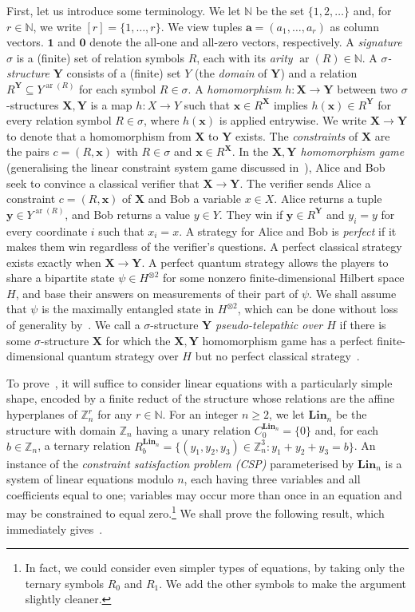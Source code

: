 \documentclass[11pt]{article}
\newcommand{\N}{\mathbb N}
\newcommand{\Z}{\mathbb Z}
\newcommand{\X}{\mathbf X}
\newcommand{\Y}{\mathbf Y}
\newcommand{\Lin}{\mathbf{Lin}}
\DeclareMathOperator{\ar}{ar}
\newcommand{\bone}{\mathbf{1}}
\newcommand{\bzero}{\mathbf{0}}
\newcommand{\ba}{\mathbf{a}}
\newcommand{\bx}{\mathbf{x}}
\newcommand{\by}{\mathbf{y}}
\theoremstyle{plain}
\theoremstyle{definition}
\theoremstyle{remark}
\begin{document}
First, let us introduce some    terminology. We let $\N$ be the set $\{1,2,\dots\}$ and, for $r\in\N$, we write $[r]=\{1,\ldots,r\}$. We view tuples $\ba=(a_1,\dots,a_r)$ as column vectors. $\bone$ and $\bzero$ denote the all-one and all-zero vectors, respectively.
%
A \emph{signature} $\sigma$ is a (finite) set of relation symbols $R$, each with its \emph{arity} $\ar(R)\in\N$.
%
A \textit{$\sigma$-structure} $\Y$ consists of a (finite) set $Y$ (the \emph{domain} of $\Y$) and a relation $R^\Y\subseteq Y^{\ar(R)}$ for each symbol $R\in\sigma$. 
A
\emph{homomorphism} $h:\X\to\Y$ between    two $\sigma$-structures $\X,\Y$ is a map $h:X\to Y$ such that
$\bx\in R^{\X}$ implies $h(\bx)\in R^{\Y}$
%
for every relation symbol $R\in\sigma$, where $h(\bx)$ is applied entrywise. We write $\X\to\Y$ to denote that a homomorphism from $\X$ to $\Y$ exists.
%
The \textit{constraints} of $\X$ are the pairs $c=(R,\bx)$ with $R\in\sigma$ and $\bx\in R^{\X}$.
%
In the \textit{$\X,\Y$ homomorphism game} (generalising the linear constraint system game discussed in~), Alice and Bob seek to convince a classical verifier that $\X\to\Y$.
%
The verifier sends Alice a constraint $c=(R,\bx)$ of $\X$ and Bob a variable $x\in X$. Alice returns a tuple $\by\in Y^{\ar(R)}$, and Bob   returns a value $y\in Y$. They win if $\mathbf y\in R^{\Y}$ and $y_i=y$ for every coordinate $i$ such that $x_i=x$.
%
A strategy for Alice and Bob is \emph{perfect} if it makes them win regardless of the verifier's questions. A perfect classical strategy exists exactly when $\X\to\Y$. A perfect quantum strategy allows the players to share a bipartite state $\psi\in H^{\otimes 2}$ for some nonzero finite-dimensional Hilbert space $H$, and base their answers on measurements of their part of $\psi$. 
We shall assume that $\psi$ is the maximally entangled state in $H^{\otimes 2}$, which can be done without loss of generality by~\cite{abramsky2017quantum}. 
%
We call a $\sigma$-structure $\Y$ \emph{pseudo-telepathic over $H$} if there is some $\sigma$-structure $\X$ for which the $\X,\Y$ homomorphism game has a perfect finite-dimensional quantum strategy over $H$ but no perfect classical strategy~\cite{galliard2002pseudo,brassard2005quantum}.

To prove~, it will suffice to consider linear equations with a particularly simple shape, encoded by a finite reduct of the structure  whose relations are the affine hyperplanes of $\Z_n^r$ for any $r\in\N$.
For an integer $n\geq2$, we let $\Lin_n$ be the
structure with domain $\Z_n$ having a unary relation $C_0^{\Lin_n}=\{0\}$ and, for each $b\in\Z_n$, a ternary relation $R_b^{\Lin_n}=\{(y_1,y_2,y_3)\in\Z_n^3:y_1+y_2+y_3=b\}$.
An instance of the \textit{constraint satisfaction problem (CSP)} parameterised by $\Lin_n$ is a system of linear equations modulo $n$, each having three variables and all coefficients equal to one;
variables may occur more than once in an equation and may be constrained to equal zero.\footnote{In fact, we could consider even simpler types of equations, by taking only the ternary symbols $R_0$ and $R_1$. We add the other symbols to make the argument slightly cleaner.} We shall prove the following result, which immediately gives~.
\end{document}
